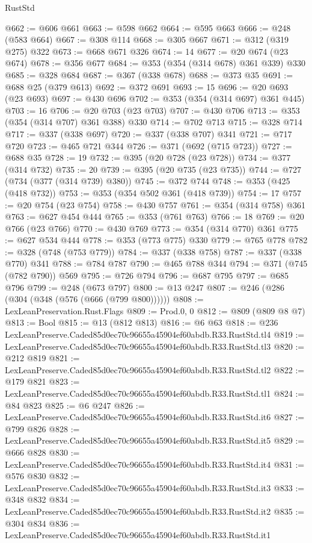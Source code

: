 \begin{lexlean}{RustStd}
\begin{coremodule}
@662 := @606 @661
@663 := @598 @662
@664 := @595 @663
@666 := @248 (@583 @664)
@667 := @308 @114
@668 := @305 @667
@671 := @312 (@319 @275) @322
@673 := @668 @671 @326
@674 := 14
@677 := @20 @674 (@23 @674)
@678 := @356 @677
@684 := @353 (@354 (@314 @678) @361 @339) @330
@685 := @328 @684
@687 := @367 (@338 @678)
@688 := @373 @35
@691 := @688 @25 (@379 @613)
@692 := @372 @691
@693 := 15
@696 := @20 @693 (@23 @693)
@697 := @430 @696
@702 := @353 (@354 (@314 @697) @361 @445)
@703 := 16
@706 := @20 @703 (@23 @703)
@707 := @430 @706
@713 := @353 (@354 (@314 @707) @361 @388) @330
@714 := @702 @713
@715 := @328 @714
@717 := @337 (@338 @697)
@720 := @337 (@338 @707) @341
@721 := @717 @720
@723 := @465 @721 @344
@726 := @371 (@692 (@715 @723))
@727 := @688 @35
@728 := 19
@732 := @395 (@20 @728 (@23 @728))
@734 := @377 (@314 @732)
@735 := 20
@739 := @395 (@20 @735 (@23 @735))
@744 := @727 (@734 (@377 (@314 @739) @380))
@745 := @372 @744
@748 := @353 (@425 (@418 @732))
@753 := @353 (@354 @502 @361 (@418 @739))
@754 := 17
@757 := @20 @754 (@23 @754)
@758 := @430 @757
@761 := @354 (@314 @758) @361
@763 := @627 @454 @444
@765 := @353 (@761 @763)
@766 := 18
@769 := @20 @766 (@23 @766)
@770 := @430 @769
@773 := @354 (@314 @770) @361
@775 := @627 @534 @444
@778 := @353 (@773 @775) @330
@779 := @765 @778
@782 := @328 (@748 (@753 @779))
@784 := @337 (@338 @758)
@787 := @337 (@338 @770) @341
@788 := @784 @787
@790 := @465 @788 @344
@794 := @371 (@745 (@782 @790)) @569
@795 := @726 @794
@796 := @687 @795
@797 := @685 @796
@799 := @248 (@673 @797)
@800 := @13 @247
@807 := @246 (@286 (@304 (@348 (@576 (@666 (@799 @800))))))
@808 := LexLeanPreservation.Rust.Flags
@809 := Prod.{0, 0}
@812 := @809 (@809 @8 @7)
@813 := Bool
@815 := @13 (@812 @813)
@816 := @6 @63
@818 := @236 LexLeanPreserve.Caded85d0ec70c96655a45904ef60abdb.R33.RustStd.tl4
@819 := LexLeanPreserve.Caded85d0ec70c96655a45904ef60abdb.R33.RustStd.tl3
@820 := @212 @819
@821 := LexLeanPreserve.Caded85d0ec70c96655a45904ef60abdb.R33.RustStd.tl2
@822 := @179 @821
@823 := LexLeanPreserve.Caded85d0ec70c96655a45904ef60abdb.R33.RustStd.tl1
@824 := @84 @823
@825 := @6 @247
@826 := LexLeanPreserve.Caded85d0ec70c96655a45904ef60abdb.R33.RustStd.it6
@827 := @799 @826
@828 := LexLeanPreserve.Caded85d0ec70c96655a45904ef60abdb.R33.RustStd.it5
@829 := @666 @828
@830 := LexLeanPreserve.Caded85d0ec70c96655a45904ef60abdb.R33.RustStd.it4
@831 := @576 @830
@832 := LexLeanPreserve.Caded85d0ec70c96655a45904ef60abdb.R33.RustStd.it3
@833 := @348 @832
@834 := LexLeanPreserve.Caded85d0ec70c96655a45904ef60abdb.R33.RustStd.it2
@835 := @304 @834
@836 := LexLeanPreserve.Caded85d0ec70c96655a45904ef60abdb.R33.RustStd.it1

\end{coremodule}
\end{lexlean}
